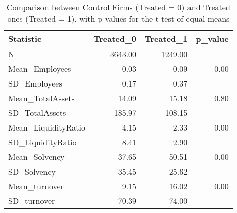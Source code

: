 \begin{table}[ht]
\centering
\begin{tabular}{lrrr}
  \hline
Statistic & Treated\_0 & Treated\_1 & p\_value \\ 
  \hline
N & 3643.00 & 1249.00 &  \\ 
  Mean\_Employees & 0.03 & 0.09 & 0.00 \\ 
  SD\_Employees & 0.17 & 0.37 &  \\ 
  Mean\_TotalAssets & 14.09 & 15.18 & 0.80 \\ 
  SD\_TotalAssets & 185.97 & 108.15 &  \\ 
  Mean\_LiquidityRatio & 4.15 & 2.33 & 0.00 \\ 
  SD\_LiquidityRatio & 8.41 & 2.90 &  \\ 
  Mean\_Solvency & 37.65 & 50.51 & 0.00 \\ 
  SD\_Solvency & 35.45 & 25.62 &  \\ 
  Mean\_turnover & 9.15 & 16.02 & 0.00 \\ 
  SD\_turnover & 70.39 & 74.00 &  \\ 
   \hline
\end{tabular}
\caption{Comparison between Control Firms (Treated = 0) and Treated ones (Treated = 1), with p-values for the t-test of equal means} 
\end{table}

